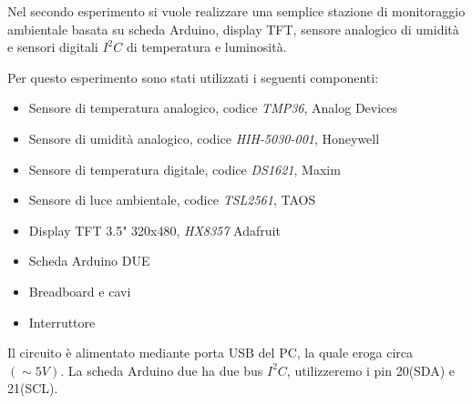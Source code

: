Nel secondo esperimento si vuole realizzare una semplice stazione di monitoraggio ambientale basata su scheda Arduino, display TFT, sensore analogico di umidità e sensori digitali $I^2C$ di temperatura e luminosità.  



Per questo esperimento sono stati utilizzati i seguenti componenti:
\begin{itemize}
    \item Sensore di temperatura analogico, codice \textit{TMP36}, Analog Devices
    \item Sensore di umidità analogico, codice \textit{HIH-5030-001}, Honeywell
    \item Sensore di temperatura digitale, codice \textit{DS1621}, Maxim
    \item Sensore di luce ambientale, codice \textit{TSL2561}, TAOS
    \item Display TFT 3.5" 320x480, \textit{HX8357} Adafruit
    \item Scheda Arduino DUE
    \item Breadboard e cavi
    \item Interruttore
\end{itemize}
Il circuito è alimentato mediante porta USB del PC, la quale eroga circa $(\sim 5 V)$. 
La scheda Arduino due ha due bus $I^2C$, utilizzeremo i pin 20(SDA) e 21(SCL).
